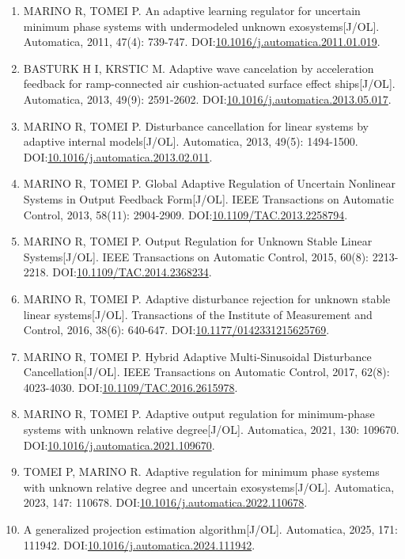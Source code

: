 \documentclass[
  12pt,
  a4paper
]{article}
\begin{document}
\begin{enumerate}
  Phase Systems with Unknown Undermodeled Exosystems{[}J/OL{]}. IFAC
  Proceedings Volumes, 2008, 41(2): 11293-11298.
  DOI:\href{https://doi.org/10.3182/20080706-5-KR-1001.01913}{10.3182/20080706-5-KR-1001.01913}.
\item
  MARINO R, TOMEI P. An adaptive learning regulator for uncertain
  minimum phase systems with undermodeled unknown exosystems{[}J/OL{]}.
  Automatica, 2011, 47(4): 739-747.
  DOI:\href{https://doi.org/10.1016/j.automatica.2011.01.019}{10.1016/j.automatica.2011.01.019}.
\item
  BASTURK H I, KRSTIC M. Adaptive wave cancelation by acceleration
  feedback for ramp-connected air cushion-actuated surface effect
  ships{[}J/OL{]}. Automatica, 2013, 49(9): 2591-2602.
  DOI:\href{https://doi.org/10.1016/j.automatica.2013.05.017}{10.1016/j.automatica.2013.05.017}.
\item
  MARINO R, TOMEI P. Disturbance cancellation for linear systems by
  adaptive internal models{[}J/OL{]}. Automatica, 2013, 49(5):
  1494-1500.
  DOI:\href{https://doi.org/10.1016/j.automatica.2013.02.011}{10.1016/j.automatica.2013.02.011}.
\item
  MARINO R, TOMEI P. Global Adaptive Regulation of Uncertain Nonlinear
  Systems in Output Feedback Form{[}J/OL{]}. IEEE Transactions on
  Automatic Control, 2013, 58(11): 2904-2909.
  DOI:\href{https://doi.org/10.1109/TAC.2013.2258794}{10.1109/TAC.2013.2258794}.
\item
  MARINO R, TOMEI P. Output Regulation for Unknown Stable Linear
  Systems{[}J/OL{]}. IEEE Transactions on Automatic Control, 2015,
  60(8): 2213-2218.
  DOI:\href{https://doi.org/10.1109/TAC.2014.2368234}{10.1109/TAC.2014.2368234}.
\item
  MARINO R, TOMEI P. Adaptive disturbance rejection for unknown stable
  linear systems{[}J/OL{]}. Transactions of the Institute of Measurement
  and Control, 2016, 38(6): 640-647.
  DOI:\href{https://doi.org/10.1177/0142331215625769}{10.1177/0142331215625769}.
\item
  MARINO R, TOMEI P. Hybrid Adaptive Multi-Sinusoidal Disturbance
  Cancellation{[}J/OL{]}. IEEE Transactions on Automatic Control, 2017,
  62(8): 4023-4030.
  DOI:\href{https://doi.org/10.1109/TAC.2016.2615978}{10.1109/TAC.2016.2615978}.
\item
  MARINO R, TOMEI P. Adaptive output regulation for minimum-phase
  systems with unknown relative degree{[}J/OL{]}. Automatica, 2021, 130:
  109670.
  DOI:\href{https://doi.org/10.1016/j.automatica.2021.109670}{10.1016/j.automatica.2021.109670}.
\item
  TOMEI P, MARINO R. Adaptive regulation for minimum phase systems with
  unknown relative degree and uncertain exosystems{[}J/OL{]}.
  Automatica, 2023, 147: 110678.
  DOI:\href{https://doi.org/10.1016/j.automatica.2022.110678}{10.1016/j.automatica.2022.110678}.
\item
  A generalized projection estimation algorithm{[}J/OL{]}. Automatica,
  2025, 171: 111942.
  DOI:\href{https://doi.org/10.1016/j.automatica.2024.111942}{10.1016/j.automatica.2024.111942}.
\end{enumerate}
\end{document}
